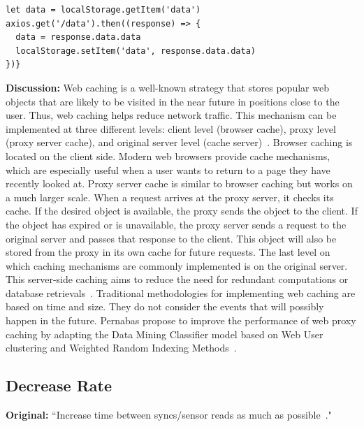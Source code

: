 \begin{minipage}{0.95\linewidth}
    \begin{lstlisting}[caption={Code snippet of a push notification implementation \cite{CacheExample}.},
    label={cachecode}]
let data = localStorage.getItem('data')
axios.get('/data').then((response) => {
  data = response.data.data
  localStorage.setItem('data', response.data.data)
})}
\end{lstlisting}
\end{minipage}

\textbf{Discussion:} Web caching is a well-known strategy that stores popular web objects that are likely to be visited in the near future in positions close to the user. Thus, web caching helps reduce network traffic. This mechanism can be implemented at three different levels: client level (browser cache), proxy level (proxy server cache), and original server level (cache server)~\cite{Ali2011}. Browser caching is located on the client side. Modern web browsers provide cache mechanisms, which are especially useful when a user wants to return to a page they have recently looked at. Proxy server cache is similar to browser caching but works on a much larger scale. When a request arrives at the proxy server, it checks its cache. If the desired object is available, the proxy sends the object to the client. If the object has expired or is unavailable, the proxy server sends a request to the original server and passes that response to the client. This object will also be stored from the proxy in its own cache for future requests. The last level on which caching mechanisms are commonly implemented is on the original server. This server-side caching aims to reduce the need for redundant computations or database retrievals~\cite{Ali2011}. Traditional methodologies for implementing web caching are based on time and size. They do not consider the events that will possibly happen in the future. Pernabas \etal propose to improve the performance of web proxy caching by adapting the Data Mining Classifier model based on Web User clustering and Weighted Random Indexing Methods~\cite{Pernabas2019}.


\subsection{Decrease Rate} \label{sec:patterns-DecreaseRate}
\textbf{Original:} ``Increase time between syncs/sensor reads as much as possible~\cite{cruz2019catalog}."


